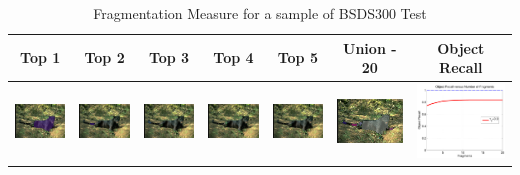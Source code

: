 \documentclass[runningheads,a4paper]{llncs}
\begin{document}
\begin{table}[h!]
\label{fig:example_frag_measure}
\caption{Fragmentation Measure for a sample of BSDS300 Test}
\centering
\hspace*{-0.6cm}
  \begin{tabular}{|c | c | c | c | c | c | c |}
    \hline
    {\bf Top 1 } & {\bf Top 2} & {\bf Top 3 } & {\bf Top 4 } & {\bf Top 5} & {\bf Union - 20} & {\bf Object Recall} \\
    \hline
    \includegraphics[width=0.14\linewidth]{figs/304034_top_1_fragments.jpg}&
    \includegraphics[width=0.14\linewidth]{figs/304034_top_2_fragments.jpg}&
    \includegraphics[width=0.14\linewidth]{figs/304034_top_3_fragments.jpg}&
    \includegraphics[width=0.14\linewidth]{figs/304034_top_4_fragments.jpg}&
    \includegraphics[width=0.14\linewidth]{figs/304034_top_5_fragments.jpg}&
    \includegraphics[width=0.14\linewidth]{figs/304034_top_20_fragments_montage.jpg}&
    \includegraphics[width=0.14\linewidth]{figs/304034_object_recall_vs_fragments.pdf} \\
    \hline

\end{tabular}
\end{table}
\end{document}

